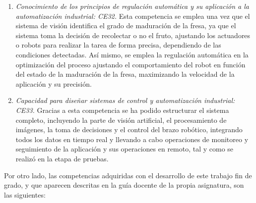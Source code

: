 \begin{enumerate}
  \item \textit{Conocimiento de los principios de regulación automática y su aplicación a la automatización industrial: CE32.} Esta competencia se emplea una vez que el sistema de visión identifica el grado de maduración de la fresa, ya que el sistema toma la decisión de recolectar o no el fruto, ajustando los actuadores o robots para realizar la tarea de forma precisa, dependiendo de las condiciones detectadas. Así mismo, se emplea la regulación automática en la optimización del proceso ajustando el comportamiento del robot en función del estado de la maduración de la fresa, maximizando la velocidad de la aplicación y su precisión.
  \item \textit{Capacidad para diseñar sistemas de control y automatización industrial: CE33.} Gracias a esta competencia se ha podido estructurar el sistema completo, incluyendo la parte de visión artificial, el procesamiento de imágenes, la toma de decisiones y el control del brazo robótico, integrando todos los datos en tiempo real y llevando a cabo operaciones de monitoreo y seguimiento de la aplicación y sus operaciones en remoto, tal y como se realizó en la etapa de pruebas.
  
\end{enumerate}  

Por otro lado, las competencias adquiridas con el desarrollo de este trabajo fin de grado, y que aparecen descritas en la guía docente de la propia asignatura, son las siguientes:


